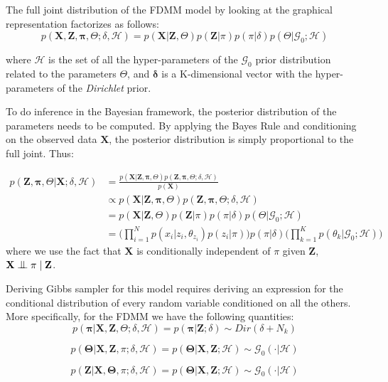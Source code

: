 \vspace*{5mm}
The full joint distribution of the FDMM model by looking at the graphical representation factorizes as follows:
\begin{equation}%
	p(\mathbf{X},\mathbf{Z},\mathbf{\pi},\Theta;\delta,\mathcal{H}) = p(\mathbf{X}|\mathbf{Z},\Theta) p(\mathbf{Z}|\pi) p(\pi|\delta) p(\Theta |\mathcal{G}_{0}; \mathcal{H})
\end{equation}

where $\mathcal{H}$ is the set of all the hyper-parameters of the $\mathcal{G}_{0}$ prior distribution related to the parameters $\Theta$, and $\mathbf{\delta}$ is a K-dimensional vector with the hyper-parameters of the \emph{Dirichlet} prior. 

To do inference in the Bayesian framework, the posterior distribution of the parameters needs to be computed. By applying the Bayes Rule and conditioning on the observed data $\mathbf{X}$, the posterior distribution is simply proportional to the full joint. Thus:
 
\begin{equation}%
  \begin{aligned}
	p(\mathbf{Z},\mathbf{\pi},\Theta|\mathbf{X} ;\delta,\mathcal{H}) & = \frac{p(\mathbf{X}|\mathbf{Z},\mathbf{\pi},\Theta) p(\mathbf{Z},\mathbf{\pi},\Theta ;\delta,\mathcal{H})}{p(\mathbf{X})} \\
	   & \propto p(\mathbf{X}|\mathbf{Z},\mathbf{\pi},\Theta) p(\mathbf{Z},\mathbf{\pi},\Theta ;\delta,\mathcal{H}) \\
	   & = p(\mathbf{X}|\mathbf{Z},\Theta) p(\mathbf{Z}|\pi) p(\pi|\delta) p(\Theta |\mathcal{G}_{0}; \mathcal{H}) \\
	   & = \bigg(\prod\limits_{i=1}^{N} p(x_{i}|z_{i},\theta_{z_{i}}) p(z_{i}|\pi)\bigg) p(\pi|\delta) \bigg(\prod\limits_{k=1}^{K} p(\theta_{k} |\mathcal{G}_{0}; \mathcal{H})\bigg)
  \end{aligned}
\end{equation}
where we use the fact that $\mathbf{X}$ is conditionally independent of $\pi$ given $\mathbf{Z}$, \ie $\mathbf{X} \bigCI \pi \;| \; \mathbf{Z} $. 


Deriving Gibbs sampler for this model requires deriving an expression for the conditional distribution of every random variable conditioned on all the others. More specifically, for the FDMM we have the following quantities:
\begin{equation}%
	p(\mathbf{\pi}|\mathbf{X},\mathbf{Z},\Theta;\delta,\mathcal{H}) = p(\mathbf{\pi} | \mathbf{Z};\delta) \sim Dir(\delta + N_{k})
\end{equation}

\begin{equation}%
	p(\mathbf{\Theta}|\mathbf{X},\mathbf{Z},\pi;\delta,\mathcal{H}) = p(\mathbf{\Theta}|\mathbf{X},\mathbf{Z};\mathcal{H}) \sim \mathcal{G}_{0}(\cdot|\mathcal{H})
\end{equation}

\begin{equation}%
	p(\mathbf{Z}|\mathbf{X},\mathbf{\Theta},\pi;\delta,\mathcal{H}) = p(\mathbf{\Theta}|\mathbf{X},\mathbf{Z};\mathcal{H}) \sim \mathcal{G}_{0}(\cdot|\mathcal{H})
\end{equation}